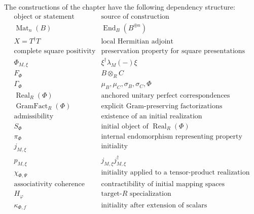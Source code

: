 The constructions of the chapter have the following dependency structure:
\[
\begin{array}{c|c}
\text{object or statement}
&
\text{source of construction}
\\
\hline
\operatorname{Mat}_n(B)
&
\operatorname{End}_B(B^{\oplus n})
\\
X=T^\dagger T
&
\text{local Hermitian adjoint}
\\
\text{complete square positivity}
&
\text{preservation property for square presentations}
\\
\Phi_{M,\xi}
&
\xi^\dagger\lambda_M(-)\xi
\\
F_\Phi
&
B\otimes_RC
\\
\Gamma_\Phi
&
\mu_B,\mu_C,\sigma_B,\sigma_C,\Phi
\\
\operatorname{Real}_R(\Phi)
&
\text{anchored unitary perfect correspondences}
\\
\operatorname{GramFact}_R(\Phi)
&
\text{explicit Gram-preserving factorizations}
\\
\text{admissibility}
&
\text{existence of an initial realization}
\\
S_\Phi
&
\text{initial object of }\operatorname{Real}_R(\Phi)
\\
\pi_\Phi
&
\text{internal endomorphism representing property}
\\
j_{M,\xi}
&
\text{initiality}
\\
p_{M,\xi}
&
j_{M,\xi}j_{M,\xi}^\dagger
\\
\chi_{\Phi,\Psi}
&
\text{initiality applied to a tensor-product realization}
\\
\text{associativity coherence}
&
\text{contractibility of initial mapping spaces}
\\
H_\varphi
&
\text{target-}R\text{ specialization}
\\
\kappa_{\Phi,f}
&
\text{initiality after extension of scalars}
\end{array}
\]

